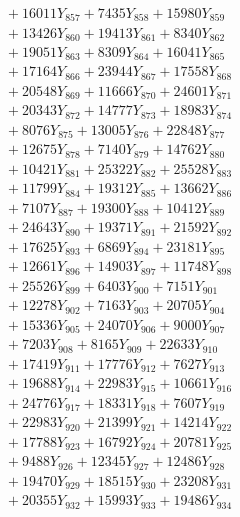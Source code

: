 \documentclass[a4paper,10pt]{article}
\begin{document}
{\begin{align}
&\;  + 16011 Y_{857} + 7435 Y_{858} + 15980 Y_{859} \\[0.3ex]
&\;  + 13426 Y_{860} + 19413 Y_{861} + 8340 Y_{862} \\[0.3ex]
&\;  + 19051 Y_{863} + 8309 Y_{864} + 16041 Y_{865} \\[0.3ex]
&\;  + 17164 Y_{866} + 23944 Y_{867} + 17558 Y_{868} \\[0.5ex]\allowbreak
&\;  + 20548 Y_{869} + 11666 Y_{870} + 24601 Y_{871} \\[0.3ex]
&\;  + 20343 Y_{872} + 14777 Y_{873} + 18983 Y_{874} \\[0.3ex]
&\;  + 8076 Y_{875} + 13005 Y_{876} + 22848 Y_{877} \\[0.3ex]
&\;  + 12675 Y_{878} + 7140 Y_{879} + 14762 Y_{880} \\[0.3ex]
&\;  + 10421 Y_{881} + 25322 Y_{882} + 25528 Y_{883} \\[0.3ex]
&\;  + 11799 Y_{884} + 19312 Y_{885} + 13662 Y_{886} \\[0.3ex]
&\;  + 7107 Y_{887} + 19300 Y_{888} + 10412 Y_{889} \\[0.3ex]
&\;  + 24643 Y_{890} + 19371 Y_{891} + 21592 Y_{892} \\[0.3ex]
&\;  + 17625 Y_{893} + 6869 Y_{894} + 23181 Y_{895} \\[0.3ex]
&\;  + 12661 Y_{896} + 14903 Y_{897} + 11748 Y_{898} \\[0.5ex]\allowbreak
&\;  + 25526 Y_{899} + 6403 Y_{900} + 7151 Y_{901} \\[0.3ex]
&\;  + 12278 Y_{902} + 7163 Y_{903} + 20705 Y_{904} \\[0.3ex]
&\;  + 15336 Y_{905} + 24070 Y_{906} + 9000 Y_{907} \\[0.3ex]
&\;  + 7203 Y_{908} + 8165 Y_{909} + 22633 Y_{910} \\[0.3ex]
&\;  + 17419 Y_{911} + 17776 Y_{912} + 7627 Y_{913} \\[0.3ex]
&\;  + 19688 Y_{914} + 22983 Y_{915} + 10661 Y_{916} \\[0.3ex]
&\;  + 24776 Y_{917} + 18331 Y_{918} + 7607 Y_{919} \\[0.3ex]
&\;  + 22983 Y_{920} + 21399 Y_{921} + 14214 Y_{922} \\[0.3ex]
&\;  + 17788 Y_{923} + 16792 Y_{924} + 20781 Y_{925} \\[0.3ex]
&\;  + 9488 Y_{926} + 12345 Y_{927} + 12486 Y_{928} \\[0.5ex]\allowbreak
&\;  + 19470 Y_{929} + 18515 Y_{930} + 23208 Y_{931} \\[0.3ex]
&\;  + 20355 Y_{932} + 15993 Y_{933} + 19486 Y_{934} \\[0.3ex]

\end{align}}
\end{document}
